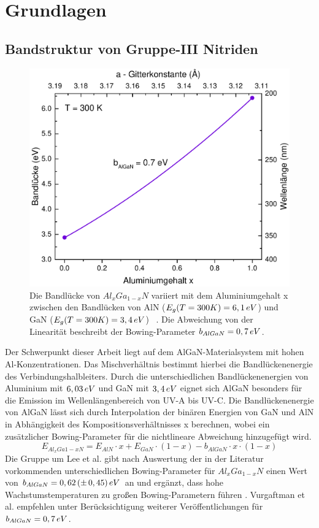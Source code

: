 \chapter{Grundlagen}
\thispagestyle{fancy}

\section{Bandstruktur von Gruppe-III Nitriden}
\begin{figure}[!htb]
    \centering
    \begin{minipage}[t]{\linewidth}
        \centering
        \includegraphics[width=0.5\linewidth]{Bilder/bandluecke.pdf}
        \caption{Die Bandlücke von $Al_{x}Ga_{1-x}N$ variiert mit dem Aluminiumgehalt x zwischen den Bandlücken von AlN ($E_{g}(T = 300 K) = 6,1 \thinspace eV$) und GaN ($E_{g}(T = 300 K) = 3,4 \thinspace  eV$) ~\cite{pipr}. Die Abweichung von der Linearität beschreibt der Bowing-Parameter $b_{AlGaN} = 0,7 \thinspace eV$.} 
        \label{fig:wurtz}
    \end{minipage}%
\end{figure}
\noindent
Der Schwerpunkt dieser Arbeit liegt auf dem AlGaN-Materialsystem mit hohen Al-Konzentrationen. Das Mischverhältnis bestimmt hierbei die Bandlückenenergie des Verbindungshalbleiters. Durch die unterschiedlichen Bandlückenenergien von Aluminium mit $6,03 \thinspace eV$\cite{fenaln} und GaN mit $3,4 \thinspace eV$ \cite{pipr} eignet sich AlGaN besonders für die Emission im Wellenlängenbereich von UV-A bis UV-C. 
Die Bandlückenenergie von AlGaN lässt sich durch Interpolation der binären Energien von GaN und AlN in Abhängigkeit des Kompositionsverhältnisses x berechnen, wobei ein zusätzlicher Bowing-Parameter für die nichtlineare Abweichung hinzugefügt wird. 
%
\begin{equation}
    E_{Al_{x}Ga{1-x}N} = E_{AlN} \cdot x + E_{GaN} \cdot (1-x) - b_{AlGaN} \cdot x \cdot (1-x) 
\end{equation}
%
Die Gruppe um Lee et al. gibt nach Auswertung der in der Literatur vorkommenden unterschiedlichen Bowing-Parameter für $Al_{x}Ga_{1-x}N$ einen Wert von $b_{AlGaN} = 0,62\thinspace(\pm \thinspace 0,45)\thinspace eV$ an und ergänzt, dass hohe Wachstumstemperaturen zu großen Bowing-Parametern führen \cite{doi:10.1063/1.123339}.
Vurgaftman et al. empfehlen unter Berücksichtigung weiterer Veröffentlichungen für $b_{AlGaN} =  0,7 \thinspace eV$.



